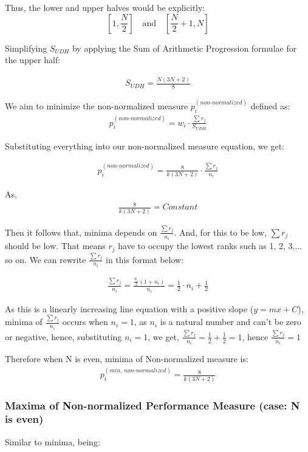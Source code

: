 \documentclass[a4paper,fleqn,review]{cas-sc}
\begin{document}
Thus, the lower and upper halves would be explicitly:
\[
\left[1, \frac{N}{2}\right] \quad \text{and} \quad \left[\frac{N}{2}+1, N\right]
\]

Simplifying $S_{UDH}$ by applying the Sum of Arithmetic Progression formulae for the upper half:

\begin{align*}
	S_{UDH} = \frac{N(3N + 2)}{8}
\end{align*}


We aim to minimize the non-normalized measure $p_i^{(non\text{-}normalized)}$ defined as:
\begin{align*}
	p_i^{(non\text{-}normalized)} = w_i \cdot \frac{\sum r_j}{ S_{UDH} }
\end{align*}

Substituting everything into our non-normalized measure equation, we get:

\begin{align*}
	p_i^{(non\text{-}normalized)} = \frac{8}{k(3N + 2)}\cdot \frac{\sum r_j}{n_i}
	\label{eq:simplified-even-non-normalized}
\end{align*}


As, 
\begin{align*}
	\frac{8}{k(3N + 2)} = Constant
\end{align*}

Then it follows that, minima depends on $\frac{\sum r_j}{n_i}$. And, for this to be low, $\sum r_j$ should be low. That means $r_j$ have to occupy the lowest ranks such as 1, 2, 3,... so on. We can rewrite $\frac{\sum r_j}{n_i}$ in this format below:

\begin{align*}
	\frac{\sum r_j}{n_i} = \frac{\frac{n_i}{2}(1+n_i)}{n_i} = \frac{1}{2} \cdot n_i + \frac{1}{2}
\end{align*}

As this is a linearly increasing line equation with a positive slope ($y = mx + C$), minima of $\frac{\sum r_j}{n_i}$ occurs when $n_i = 1$, as $n_i$ is a natural number and can't be zero or negative, hence, substituting $n_i = 1$, we get, $\frac{\sum r_j}{n_i} = \frac{1}{2} + \frac{1}{2} = 1$, hence  $\frac{\sum r_j}{n_i} = 1 $

Therefore when N is even, minima of Non-normalized measure is:
\begin{align*}
	p_i^{(min, \, non\text{-}normalized)} = \frac{8}{k(3N + 2)}
\end{align*}

\subsubsection{Maxima of Non-normalized Performance Measure (case: N is even)}
Similar to minima, being:
\end{document}
